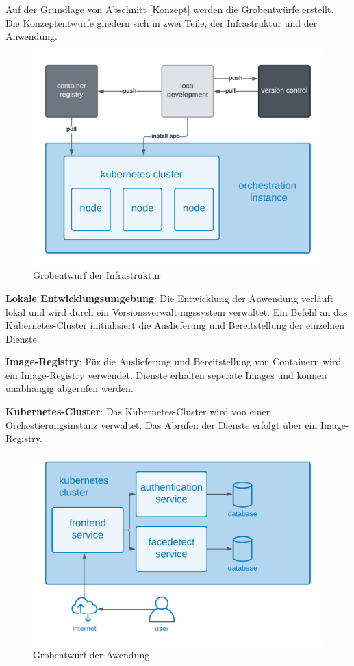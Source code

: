 Auf der Grundlage von Abschnitt \ref{Konzept} werden die Grobentwürfe erstellt.
Die Konzeptentwürfe gliedern sich in zwei Teile, der Infrastruktur und der Anwendung.

\begin{figure}[!htb]
    \centering
    \includegraphics[width=0.8\columnwidth]{images/GrobentwurfInfrastruktur.png}
    \caption{Grobentwurf der Infrastruktur}
    \label{fig:GrobentwurfInfrastruktur}
  \end{figure}

\textbf{Lokale Entwicklungsumgebung}: Die Entwicklung der Anwendung verläuft lokal und wird durch ein Versionsverwaltungssystem verwaltet.
Ein Befehl an das Kubernetes-Cluster initialisiert die Auslieferung und Bereitstellung der einzelnen Dienste. 

\textbf{Image-Registry}: Für die Auslieferung und Bereitstellung von Containern wird ein Image-Registry verwendet.
Dienste erhalten seperate Images und können unabhängig abgerufen werden.

\textbf{Kubernetes-Cluster}: Das Kubernetes-Cluster wird von einer Orchestierungsinstanz verwaltet.
Das Abrufen der Dienste erfolgt über ein Image-Registry.

\begin{figure}[!htb]
    \centering
    \includegraphics[width=0.8\columnwidth]{images/GrobentwurfAnwendung.png}
    \caption{Grobentwurf der Awendung}
    \label{fig:GrobentwurfAnwendung}
  \end{figure}

